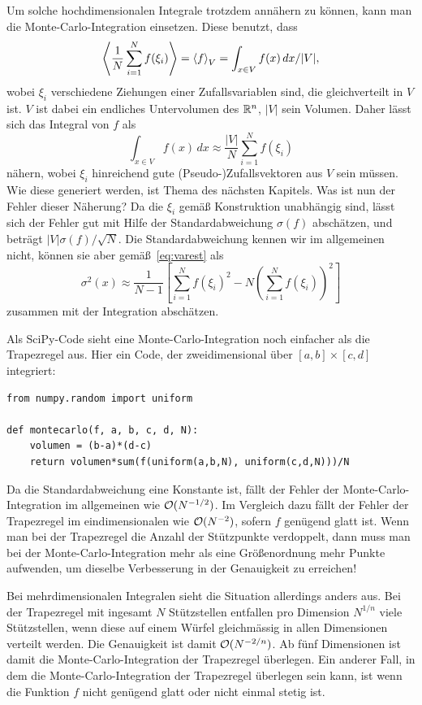 Um solche hochdimensionalen Integrale trotzdem annähern zu können,
kann man die Monte-Carlo-Integration einsetzen. Diese benutzt, dass
\begin{equation}
  \left\langle{\frac{1}{N} \sum_{i=1}^N f(\xi_i)}\right\rangle = \left\langle{f}\right\rangle_{V} =
  \int_{x\in V} f(x)\,dx / |V|,
\end{equation}
wobei $\xi_i$ verschiedene Ziehungen einer Zufallsvariablen sind, die
gleichverteilt in $V$ ist. $V$ ist dabei ein endliches Untervolumen
des $\mathbb{R}^n$, $|V|$ sein Volumen. Daher lässt sich das Integral von $f$
als
\begin{equation}
  \int_{x\in V} f(x)\,dx \approx \frac{|V|}{N} \sum_{i=1}^N f(\xi_i)
\end{equation}
nähern, wobei $\xi_i$ hinreichend gute (Pseudo-)Zufallsvektoren aus
$V$ sein müssen. Wie diese generiert werden, ist Thema des nächsten
Kapitels. Was ist nun der Fehler dieser Näherung? Da die $\xi_i$ gemäß
Konstruktion unabhängig sind, lässt sich der Fehler gut mit Hilfe der
Standardabweichung $\sigma(f)$ abschätzen, und beträgt
$|V|\sigma(f)/\sqrt{N}$. Die Standardabweichung kennen wir im
allgemeinen nicht, können sie aber gemäß~\eqref{eq:varest} als
\begin{equation}
  \sigma^2(x) \approx \frac{1}{N-1} \left[\sum_{i=1}^N f(\xi_i)^2 -
    N\left(\sum_{i=1}^Nf(\xi_i)\right)^2\right]
\end{equation}
zusammen mit der Integration abschätzen.

Als SciPy-Code sieht eine Monte-Carlo-Integration noch einfacher als
die Trapezregel aus. Hier ein Code, der zweidimensional über
$[a,b]\times[c,d]$ integriert:
\begin{lstlisting}
from numpy.random import uniform

def montecarlo(f, a, b, c, d, N):
    volumen = (b-a)*(d-c)
    return volumen*sum(f(uniform(a,b,N), uniform(c,d,N)))/N
\end{lstlisting}

Da die Standardabweichung eine Konstante ist, fällt der Fehler der
Monte-Carlo-Integration im allgemeinen wie $\mathcal O(N^{-1/2})$. Im
Vergleich dazu fällt der Fehler der Trapezregel im eindimensionalen
wie $\mathcal O(N^{-2})$, sofern $f$ genügend glatt ist. Wenn man bei der
Trapezregel die Anzahl der Stützpunkte verdoppelt, dann muss man bei
der Monte-Carlo-Integration mehr als eine Größenordnung mehr Punkte
aufwenden, um dieselbe Verbesserung in der Genauigkeit zu erreichen!

Bei mehrdimensionalen Integralen sieht die Situation allerdings anders
aus. Bei der Trapezregel mit ingesamt $N$ Stützstellen entfallen pro
Dimension $N^{1/n}$ viele Stützstellen, wenn diese auf einem Würfel
gleichmässig in allen Dimensionen verteilt werden.  Die Genauigkeit
ist damit $\mathcal O(N^{-2/n})$.  Ab fünf Dimensionen ist damit die
Monte-Carlo-Integration der Trapezregel überlegen.  Ein anderer Fall,
in dem die Monte-Carlo-Integration der Trapezregel überlegen sein
kann, ist wenn die Funktion $f$ nicht genügend glatt oder nicht einmal
stetig ist.

